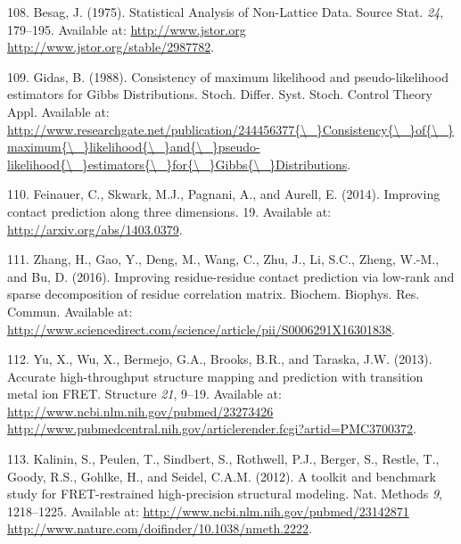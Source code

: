 \documentclass[11pt,a4paper,twoside]{book}
\theoremstyle{definition}
\theoremstyle{definition}
\theoremstyle{remark}
\begin{document}
\hypertarget{ref-Besag1975}{}
108. Besag, J. (1975). Statistical Analysis of Non-Lattice Data. Source
Stat. \emph{24}, 179--195. Available at:
\href{http://www.jstor.org\%20http://www.jstor.org/stable/2987782}{http://www.jstor.org http://www.jstor.org/stable/2987782}.

\hypertarget{ref-Gidas1988}{}
109. Gidas, B. (1988). Consistency of maximum likelihood and
pseudo-likelihood estimators for Gibbs Distributions. Stoch. Differ.
Syst. Stoch. Control Theory Appl. Available at:
\href{http://www.researchgate.net/publication/244456377\%7B/_\%7DConsistency\%7B/_\%7Dof\%7B/_\%7Dmaximum\%7B/_\%7Dlikelihood\%7B/_\%7Dand\%7B/_\%7Dpseudo-likelihood\%7B/_\%7Destimators\%7B/_\%7Dfor\%7B/_\%7DGibbs\%7B/_\%7DDistributions}{http://www.researchgate.net/publication/244456377\{\textbackslash{}\_\}Consistency\{\textbackslash{}\_\}of\{\textbackslash{}\_\}maximum\{\textbackslash{}\_\}likelihood\{\textbackslash{}\_\}and\{\textbackslash{}\_\}pseudo-likelihood\{\textbackslash{}\_\}estimators\{\textbackslash{}\_\}for\{\textbackslash{}\_\}Gibbs\{\textbackslash{}\_\}Distributions}.

\hypertarget{ref-Feinauer2014}{}
110. Feinauer, C., Skwark, M.J., Pagnani, A., and Aurell, E. (2014).
Improving contact prediction along three dimensions. 19. Available at:
\url{http://arxiv.org/abs/1403.0379}.

\hypertarget{ref-Zhang2016}{}
111. Zhang, H., Gao, Y., Deng, M., Wang, C., Zhu, J., Li, S.C., Zheng,
W.-M., and Bu, D. (2016). Improving residue-residue contact prediction
via low-rank and sparse decomposition of residue correlation matrix.
Biochem. Biophys. Res. Commun. Available at:
\url{http://www.sciencedirect.com/science/article/pii/S0006291X16301838}.

\hypertarget{ref-Yu2013}{}
112. Yu, X., Wu, X., Bermejo, G.A., Brooks, B.R., and Taraska, J.W.
(2013). Accurate high-throughput structure mapping and prediction with
transition metal ion FRET. Structure \emph{21}, 9--19. Available at:
\href{http://www.ncbi.nlm.nih.gov/pubmed/23273426\%20http://www.pubmedcentral.nih.gov/articlerender.fcgi?artid=PMC3700372}{http://www.ncbi.nlm.nih.gov/pubmed/23273426 http://www.pubmedcentral.nih.gov/articlerender.fcgi?artid=PMC3700372}.

\hypertarget{ref-Kalinin2012}{}
113. Kalinin, S., Peulen, T., Sindbert, S., Rothwell, P.J., Berger, S.,
Restle, T., Goody, R.S., Gohlke, H., and Seidel, C.A.M. (2012). A
toolkit and benchmark study for FRET-restrained high-precision
structural modeling. Nat. Methods \emph{9}, 1218--1225. Available at:
\href{http://www.ncbi.nlm.nih.gov/pubmed/23142871\%20http://www.nature.com/doifinder/10.1038/nmeth.2222}{http://www.ncbi.nlm.nih.gov/pubmed/23142871 http://www.nature.com/doifinder/10.1038/nmeth.2222}.
\end{document}
